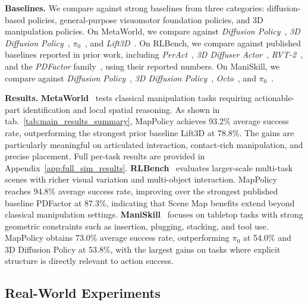 \textbf{Baselines.}
We compare against strong baselines from three categories: diffusion-based policies, general-purpose visuomotor foundation policies, and 3D manipulation policies.
On MetaWorld, we compare against \textit{Diffusion Policy}~\cite{chi2024diffusionpolicy}, \textit{3D Diffusion Policy}~\cite{Ze2024DP3}, \textit{$\pi_0$}~\cite{black2026pi0visionlanguageactionflowmodel}, and \textit{Lift3D}~\cite{Jia_2025_CVPR}.
On RLBench, we compare against published baselines reported in prior work, including \textit{PerAct}~\cite{shridhar2022peract}, \textit{3D Diffuser Actor}~\cite{3d_diffuser_actor}, \textit{RVT-2}~\cite{goyal2024rvt2}, and the \textit{PDFactor} family~\cite{Tian_2025_CVPR}, using their reported numbers.
On ManiSkill, we compare against \textit{Diffusion Policy}~\cite{chi2024diffusionpolicy}, \textit{3D Diffusion Policy}~\cite{Ze2024DP3}, \textit{Octo}~\cite{octo_2023}, and \textit{$\pi_0$}~\cite{black2026pi0visionlanguageactionflowmodel}.






\textbf{Results.}
\textbf{MetaWorld}~\cite{Yu2020Meta,mclean2025metaworld} tests classical manipulation tasks requiring actionable-part identification and local spatial reasoning. As shown in tab.~\ref{tab:main_results_summary}, MapPolicy achieves 93.2\% average success rate, outperforming the strongest prior baseline Lift3D at 78.8\%. The gains are particularly meaningful on articulated interaction, contact-rich manipulation, and precise placement. Full per-task results are provided in Appendix~\ref{app:full_sim_results}.
\textbf{RLBench}~\cite{James2020RLBench} evaluates larger-scale multi-task scenes with richer visual variation and multi-object interaction. MapPolicy reaches 94.8\% average success rate, improving over the strongest published baseline PDFactor at 87.3\%, indicating that Scene Map benefits extend beyond classical manipulation settings.
\textbf{ManiSkill}~\cite{Gu2023ManiSkill2} focuses on tabletop tasks with strong geometric constraints such as insertion, plugging, stacking, and tool use. MapPolicy obtains 73.0\% average success rate, outperforming $\pi_0$ at 54.0\% and 3D Diffusion Policy at 53.8\%, with the largest gains on tasks where explicit structure is directly relevant to action success.

\subsection{Real-World Experiments}
\label{sec:real_world_experiments}

